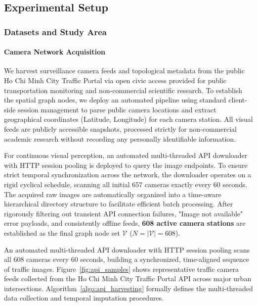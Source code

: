 \documentclass[journal,twocolumn]{IEEEtran}
\begin{document}
\subsection{Experimental Setup}

\subsubsection{Datasets and Study Area}
\label{sec:datasets}

\paragraph{Camera Network Acquisition}
We harvest surveillance camera feeds and topological metadata from the public Ho Chi Minh City Traffic Portal via open civic access provided for public transportation monitoring and non-commercial scientific research. To establish the spatial graph nodes, we deploy an automated pipeline using standard client-side session management to parse public camera locations and extract geographical coordinates (Latitude, Longitude) for each camera station. All visual feeds are publicly accessible snapshots, processed strictly for non-commercial academic research without recording any personally identifiable information. 

For continuous visual perception, an automated multi-threaded API downloader with HTTP session pooling is deployed to query the image endpoints. To ensure strict temporal synchronization across the network, the downloader operates on a rigid cyclical schedule, scanning all initial 657 cameras exactly every 60 seconds. The acquired raw images are automatically organized into a time-aware hierarchical directory structure to facilitate efficient batch processing. After rigorously filtering out transient API connection failures, "Image not available" error payloads, and consistently offline feeds, \textbf{608 active camera stations} are established as the final graph node set $\mathcal{V}$ ($N = |\mathcal{V}| = 608$).

An automated multi-threaded API downloader with HTTP session pooling scans all 608 cameras every 60 seconds, building a synchronized, time-aligned sequence of traffic images. Figure~\ref{fig:api_samples} shows representative traffic camera feeds collected from the Ho Chi Minh City Traffic Portal API across major urban intersections. Algorithm~\ref{algo:api_harvesting} formally defines the multi-threaded data collection and temporal imputation procedures.
\end{document}
